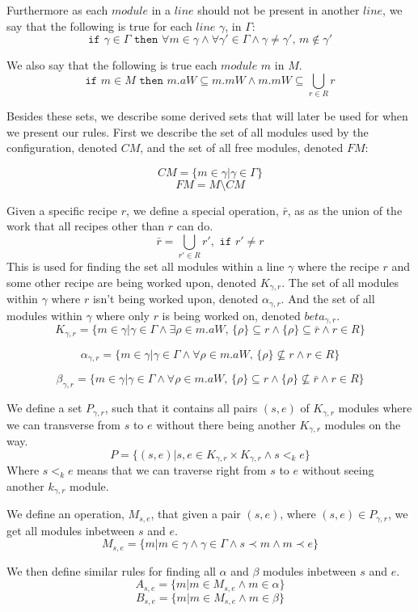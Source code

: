 Furthermore as each $module$ in a $line$ should not be present in another $line$, we say that the following is true for each $line$ $\gamma$, in $\Gamma$:
\[\texttt{if } \gamma \in \Gamma \texttt{ then } \forall m \in \gamma \land \forall \gamma ' \in \Gamma \land \gamma \neq \gamma ',\, m \notin \gamma ' \]

We also say that the following is true each $module$ $m$ in $M$.
\[\texttt{if } m \in M \texttt{ then } m.aW \subseteq m.mW \land m.mW \subseteq  \bigcup_{r\in R}r\] 


Besides these sets, we describe some derived sets that will later be used for when we present our rules. First we describe the set of all modules used by the configuration, denoted $CM$, and the set of all free modules, denoted $FM$:


\[CM = \{m \in \gamma | \gamma \in \Gamma \}\]
\[FM = M \setminus CM \]

Given a specific recipe $r$, we define a special operation, $\bar{r}$, as as the union of the work that all recipes other than $r$ can do. 
\[\bar{r} = \bigcup_{r' \in R}r', \texttt{ if } r' \neq r\]
This is used for finding the set all modules within a line $\gamma$ where the recipe $r$ and some other recipe are being worked upon, denoted $K_{\gamma ,r}$. The set of all modules within $\gamma$ where $r$ isn't being worked upon, denoted $\alpha_{\gamma ,r}$. And the set of all modules within $\gamma$ where only $r$ is being worked on, denoted $beta_{\gamma ,r}$. 
\[K_{\gamma ,r} = \{m \in \gamma | \gamma \in \Gamma \land \exists \rho \in m.aW,\, \{\rho\} \subseteq r \land \{\rho\} \subseteq \bar{r} \land r \in R\}\]

\[\alpha_{\gamma ,r}  = \{m \in \gamma | \gamma \in \Gamma \land \forall \rho \in m.aW,\, \{\rho\} \nsubseteq r \land r \in R\}\]

\[\beta_{\gamma ,r}  = \{m \in \gamma | \gamma \in \Gamma \land \forall \rho \in m.aW,\, \{\rho\} \subseteq r \land \{\rho\} \nsubseteq \bar{r} \land r \in R\}\]


We define a set $P_{\gamma ,r}$, such that it contains all pairs $(s, e)$ of $K_{\gamma ,r}$ modules where we can transverse from $s$ to $e$ without there being another $K_{\gamma, r}$ modules on the way.
\[P = \{(s, e)| {s, e} \in K_{\gamma ,r} \times K_{\gamma ,r} \land s <_k  e\}\]
Where $s <_k e$ means that we can traverse right from $s$ to $e$ without seeing another $k_{\gamma, r}$ module. 

We define an operation, $M_{s,e}$, that given a pair $(s, e)$, where $(s, e) \in P_{\gamma ,r}$, we get all modules inbetween $s$ and $e$.
\[M_{s,e} = \{m | m \in \gamma \land \gamma \in \Gamma \land s \prec m \land m \prec e\}\]

We then define similar rules for finding all $\alpha$ and $\beta$ modules inbetween $s$ and $e$.
\[A_{s,e} = \{m |m \in M_{s,e} \land m \in \alpha\}\]
\[B_{s,e} = \{m |m \in M_{s,e} \land m \in \beta\}\]






